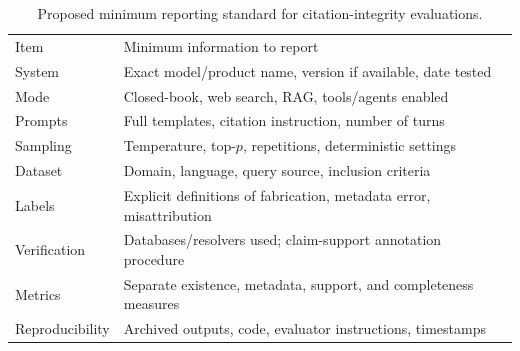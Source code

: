 \begin{table}[htbp]\caption{Proposed minimum reporting standard for citation-integrity evaluations.}\centering\footnotesize\setlength{\tabcolsep}{2pt}\begin{tabular}{@{}p{.2\linewidth}p{.77\linewidth}@{}}\toprule
Item & Minimum information to report \\
System & Exact model/product name, version if available, date tested \\
Mode & Closed-book, web search, RAG, tools/agents enabled \\
Prompts & Full templates, citation instruction, number of turns \\
Sampling & Temperature, top-$p$, repetitions, deterministic settings \\
Dataset & Domain, language, query source, inclusion criteria \\
Labels & Explicit definitions of fabrication, metadata error, misattribution \\
Verification & Databases/resolvers used; claim-support annotation procedure \\
Metrics & Separate existence, metadata, support, and completeness measures \\
Reproducibility & Archived outputs, code, evaluator instructions, timestamps \\\bottomrule\end{tabular}\end{table}